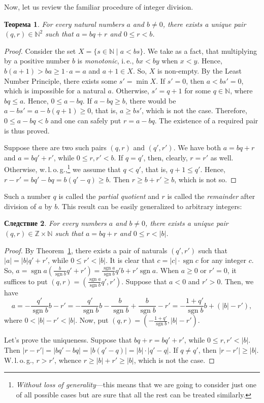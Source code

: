 \documentclass[12pt,notitlepage]{article}
\theoremstyle{plain}
\newtheorem{thm}{Теорема}[section]
\newtheorem{corr}[thm]{Следствие}
\theoremstyle{definition}
\theoremstyle{plain}
\newcommand{\N}{\mathbb{N}}
\newcommand{\Z}{\mathbb{Z}}
\newcommand{\1}{\mathbf{1}}
\newcommand{\0}{\mathbf{0}}
\DeclareMathOperator{\sgn}{sgn}
\begin{document}
Now, let us review the familiar procedure of integer division.
\begin{thm}\label{L4:t3}
	For every natural numbers $a$ and $b \neq 0$, there exists a unique pair $(q,r) \in \N^2$ such that
	$a = b q + r $ and $0 \leq r < b$.
\end{thm}
\begin{proof}
	Consider the set $X = \{ s \in \N \mid a < b s \}$. We take as a fact, that multiplying by a positive number $b$ is \emph{monotonic}, i.\,e., $b x < b y$ when $x < y$. Hence, $b (a + 1) > b a \geq  1 \cdot a = a$ and $a + 1 \in X$. So, $X$ is non-empty. By the Least Number Principle, there exists some $s' = \min X$. If $s' = 0$, then $a < bs' = 0$, which is impossible for a natural $a$. Otherwise, $s' = q + 1$ for some $q \in \N$, where $b q \leq a$. Hence, $0 \leq a - bq$. If $a - bq \geq b$, there would be $a - bs' = a - b(q + 1)  \geq 0$, that is, $a \geq bs'$, which is not the case. Therefore, $0 \leq a - bq < b$ and one can safely put $r = a - bq$. The existence of a required pair is thus proved.
	
	Suppose there are two such pairs $(q,r)$ and $(q',r')$. We have both $a = b q + r$ and $a = b q' + r'$, while $0 \leq r, r' < b$. If $q = q'$, then, clearly, $r = r'$ as well. Otherwise, w.\,l.\,o.\,g.,\footnote{\emph{Without loss of generality}---this means that we are going to consider just one of all possible cases but are sure that all the rest can be treated similarly.} we assume that $q < q'$, that is, $q + 1 \leq q'$. Hence, $r - r' = b q' - b q = b (q' - q) \geq b$. Then $r \geq b + r' \geq b$, which is not so.
\end{proof}
Such a number $q$ is called the \emph{partial quotient} and $r$ is called the \emph{remainder} after division of $a$ by $b$. This result can be easily generalized to arbitrary integers:
\begin{corr}\label{L4:c4}
	For every numbers $a$ and $b \neq 0$, there exists a unique pair $(q,r) \in \Z \times \N$ such that
	$a = b q + r $ and $0 \leq r < |b|$.
\end{corr}
\begin{proof}
	By Theorem~\ref{L4:t3}, there exists a pair of naturals $(q',r')$ such that $|a| = |b| q' + r'$, while $0 \leq r' < |b|$. It is clear that $c = |c| \cdot \sgn c$ for any integer $c$. So,
	$a = \sgn a (\frac{b}{\sgn b} q' + r') = \frac{\sgn a}{\sgn b} q' b + r' \sgn a$. When $a \geq 0$ or $r' = 0$, it suffices to put $(q, r) = (\frac{\sgn a}{\sgn b} q', r')$. Suppose that $a < 0$ and $r' > 0$. Then, we have
	$$a = -\frac{q'}{\sgn b} b - r' = -\frac{q'}{\sgn b} b - \frac{b}{\sgn b} + \frac{b}{\sgn b} - r' = -\frac{1 +q'}{\sgn b} b + (|b| - r'),$$
	where $0 < |b| - r' < |b|$. Now, put $(q,r) = (-\frac{1 + q'}{\sgn b} , |b| - r')$.
	
	Let's prove the uniqueness. Suppose that $b q + r = b q' + r'$, while $0 \leq r, r' < |b|$. Then $|r - r'| = |b q' - b q| = |b (q' - q)| = |b| \cdot |q' - q|$. If $q \neq q'$, then $|r - r'| \geq |b|$. W.\,l.\,o.\,g., $r > r'$, whence $r \geq |b| + r' \geq |b|$, which is not the case.
\end{proof}
\end{document}
